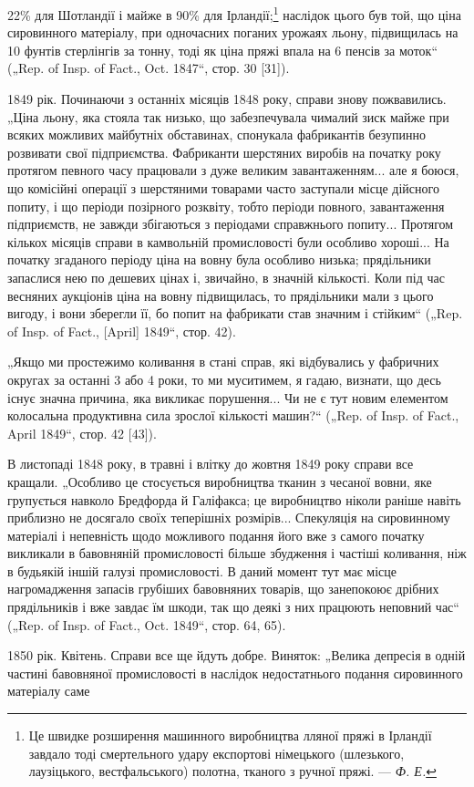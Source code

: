 \parcont{}  %
22\% для Шотландії і майже в 90\% для Ірландії;\footnote{
Це швидке розширення машинного виробництва лляної пряжі в Ірландії
завдало тоді смертельного удару експортові німецького (шлезького, лаузіцького,
вестфальського) полотна, тканого з ручної пряжі. — \emph{Ф. Е.}
} наслідок цього
був той, що ціна сировинного матеріалу, при одночасних поганих
урожаях льону, підвищилась на 10 фунтів стерлінгів за
тонну, тоді як ціна пряжі впала на 6 пенсів за моток“ („Rep.
of Insp. of Fact., Oct. 1847“, стор. 30 [31]).

1849 рік. Починаючи з останніх місяців 1848 року, справи
знову пожвавились. „Ціна льону, яка стояла так низько, що забезпечувала
чималий зиск майже при всяких можливих майбутніх
обставинах, спонукала фабрикантів безупинно розвивати свої
підприємства. Фабриканти шерстяних виробів на початку року
протягом певного часу працювали з дуже великим завантаженням...
але я боюся, що комісійні операції з шерстяними товарами
часто заступали місце дійсного попиту, і що періоди позірного
розквіту, тобто періоди повного, завантаження підприємств, не
завжди збігаються з періодами справжнього попиту... Протягом
кількох місяців справи в камвольній промисловості були особливо
хороші... На початку згаданого періоду ціна на вовну була особливо
низька; прядільники запаслися нею по дешевих цінах
і, звичайно, в значній кількості. Коли під час весняних аукціонів
ціна на вовну підвищилась, то прядільники мали з цього вигоду,
і вони зберегли її, бо попит на фабрикати став значним і стійким“
(„Rep. of Insp. of Fact., [April] 1849“, стор. 42).

„Якщо ми простежимо коливання в стані справ, які відбувались
у фабричних округах за останні 3 або 4 роки, то ми муситимем,
я гадаю, визнати, що десь існує значна причина, яка
викликає порушення... Чи не є тут новим елементом колосальна
продуктивна сила зрослої кількості машин?“ („Rep. of Insp.
of Fact., April 1849“, стор. 42 [43]).

В листопаді 1848 року, в травні і влітку до жовтня 1849 року
справи все кращали. „Особливо це стосується виробництва
тканин з чесаної вовни, яке групується навколо Бредфорда
й Галіфакса; це виробництво ніколи раніше навіть приблизно
не досягало своїх теперішніх розмірів... Спекуляція на сировинному
матеріалі і непевність щодо можливого подання його
вже з самого початку викликали в бавовняній промисловості
більше збудження і частіші коливання, ніж в будьякій іншій
галузі промисловості. В даний момент тут має місце нагромадження
запасів грубіших бавовняних товарів, що занепокоює
дрібних прядільників і вже завдає їм шкоди, так що деякі з
них працюють неповний час“ („Rep. of Insp. of Fact., Oct. 1849“,
стор. 64, 65).

1850 рік. Квітень. Справи все ще йдуть добре. Виняток:
„Велика депресія в одній частині бавовняної промисловості
в наслідок недостатнього подання сировинного матеріалу саме
\parbreak{}  %

